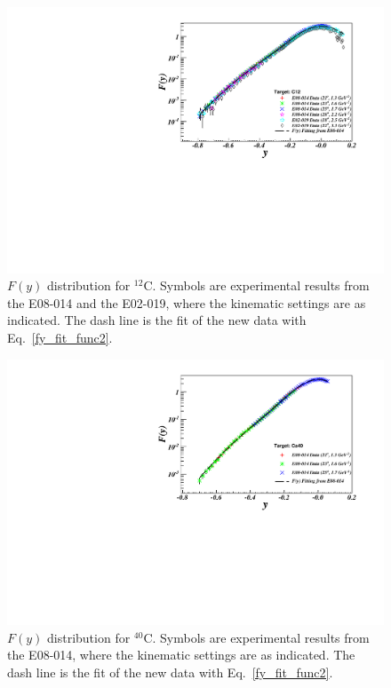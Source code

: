 \begin{figure}[!ht]
  \begin{center}
    \includegraphics[type=pdf,ext=.pdf,read=.pdf,width=.90\textwidth]{./figures/xs/C12_XGT2_Fy}
    \caption[$F(y)$ distribution for $\mathrm{^{12}C}$]{\footnotesize{$F(y)$ distribution for $\mathrm{^{12}C}$. Symbols are experimental results from the E08-014 and the E02-019, where the kinematic settings are as indicated. The dash line is the fit of the new data with Eq.~\eqref{fy_fit_func2}.}}
    \label{fy_c12_xgt2}
  \end{center}
\end{figure}
 \begin{figure}[!ht]
  \begin{center}
    \includegraphics[type=pdf,ext=.pdf,read=.pdf,width=.90\textwidth]{./figures/xs/Ca40_XGT2_Fy}
    \caption[$F(y)$ distribution for $\mathrm{^{40}Ca}$]{\footnotesize{$F(y)$ distribution for $\mathrm{^{40}C}$. Symbols are experimental results from the E08-014, where the kinematic settings are as indicated. The dash line is the fit of the new data with Eq.~\eqref{fy_fit_func2}.}}
    \label{fy_ca40_xgt2}
  \end{center}
\end{figure}
